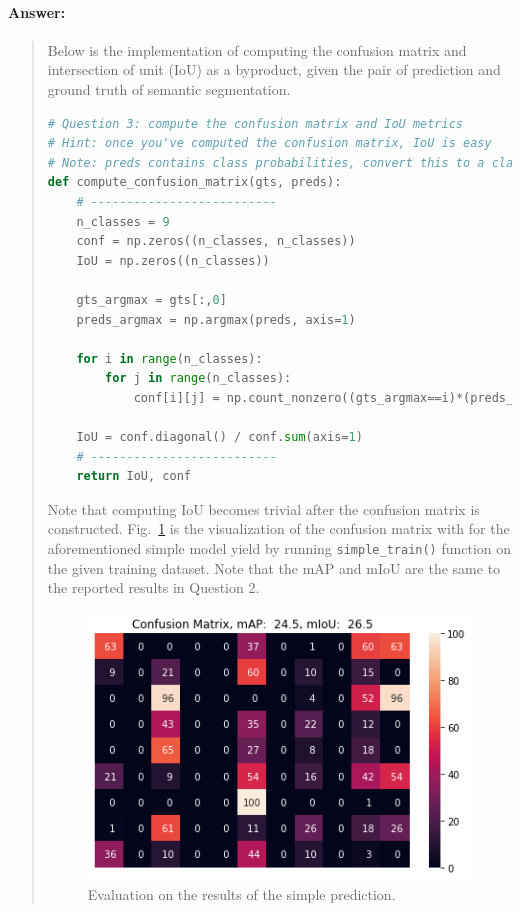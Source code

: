 \documentclass[11pt]{article}
\begin{document}
\paragraph{Answer:} 
\begin{quote}

Below is the implementation of computing the confusion matrix and intersection of unit (IoU) as a byproduct, given the pair of prediction and ground truth of semantic segmentation. 

\begin{lstlisting}[language=Python, basicstyle=\scriptsize]
# Question 3: compute the confusion matrix and IoU metrics
# Hint: once you've computed the confusion matrix, IoU is easy
# Note: preds contains class probabilities, convert this to a class prediction
def compute_confusion_matrix(gts, preds):
    # --------------------------
    n_classes = 9
    conf = np.zeros((n_classes, n_classes))
    IoU = np.zeros((n_classes))
    
    gts_argmax = gts[:,0]
    preds_argmax = np.argmax(preds, axis=1)

    for i in range(n_classes):
        for j in range(n_classes):
            conf[i][j] = np.count_nonzero((gts_argmax==i)*(preds_argmax==j))
    
    IoU = conf.diagonal() / conf.sum(axis=1)
    # --------------------------
    return IoU, conf
\end{lstlisting}

Note that computing IoU becomes trivial after the confusion matrix is constructed. Fig.~\ref{fig:eval-simple-predict} is the visualization of the confusion matrix with for the aforementioned simple model yield by running \texttt{simple\_train()} function on the given training dataset. Note that the mAP and mIoU are the same to the reported results in Question 2.

\begin{figure}[h]
    \centering
    \includegraphics[width=0.5\linewidth]{eval_simple_predict.png}
    \caption{Evaluation on the results of the simple prediction.}
    \label{fig:eval-simple-predict}
\end{figure}

\end{quote}
\end{document}
